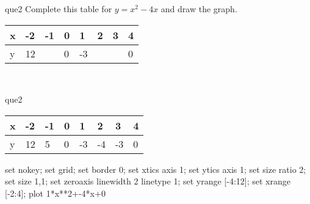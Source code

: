 \documentclass[13.5pt, varwidth=true]{beamer}
\begin{document}
\begin{frame}[shrink=19,fragile]
	\begin{beamercolorbox}[rounded=true, left, shadow=true,wd=14.8cm]{que2}
		 Complete this table for $y = x^{2} - 4x$ and draw the graph. \\[0.3cm] \renewcommand{\arraystretch}{1.2}\begin{tabular}{|C|C|C|C|C|C|C|C|} \hline x & -2 & -1 & 0 & 1 & 2 & 3 & 4 \\ \hline y & 12 &  & 0 & -3 &  &  & 0\\ \hline \end{tabular}\\[0.3cm]
	\end{beamercolorbox}
\end{frame}
\begin{frame}[shrink=19,fragile]
	\begin{beamercolorbox}[rounded=true, left, shadow=true,wd=14.8cm]{que2}
		\renewcommand{\arraystretch}{1.2}\begin{tabular}{|C|C|C|C|C|C|C|C|} \hline x & -2 & -1 & 0 & 1 & 2 & 3 & 4 \\ \hline y & 12 & 5 & 0 & -3 & -4 & -3 & 0\\ \hline \end{tabular}\begin{gnuplot}[terminal=pdf] set nokey; set grid; set border 0; set xtics axis 1; set ytics axis 1; set size ratio 2; set size 1,1; set zeroaxis linewidth 2 linetype 1; set yrange [-4:12]; set xrange [-2:4]; plot 1*x**2+-4*x+0 \end{gnuplot}
	\end{beamercolorbox}
\end{frame}
\end{document}
